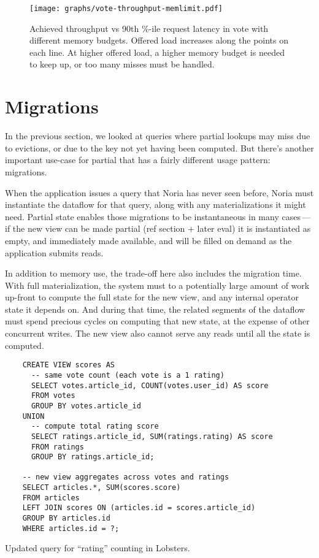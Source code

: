 \begin{figure}[ht]
  \centering
  \texttt{[image: graphs/vote-throughput-memlimit.pdf]}
  \caption{Achieved throughput vs 90th \%-ile request latency in vote with
  different memory budgets. Offered load increases along the points on each
  line. At higher offered load, a higher memory budget is needed to keep up, or
  too many misses must be handled.}
  \label{f:vote-throughput-memlimit}
\end{figure}

\section{Migrations}
\label{s:eval:cost:mig}

In the previous section, we looked at queries where partial lookups may miss due
to evictions, or due to the key not yet having been computed. But there's
another important use-case for partial that has a fairly different usage
pattern: migrations.

When the application issues a query that Noria has never seen before, Noria must
instantiate the dataflow for that query, along with any materializations it
might need. Partial state enables those migrations to be instantaneous in many
cases\,---\,if the new view can be made partial (ref section + later eval) it is
instantiated as empty, and immediately made available, and will be filled on
demand as the application submits reads.

In addition to memory use, the trade-off here also includes the migration time.
With full materialization, the system must to a potentially large amount of work
up-front to compute the full state for the new view, and any internal operator
state it depends on. And during that time, the related segments of the dataflow
must spend precious cycles on computing that new state, at the expense of other
concurrent writes. The new view also cannot serve any reads until all the state
is computed.

\begin{listing}[t]
  \begin{verbatim}
    CREATE VIEW scores AS
      -- same vote count (each vote is a 1 rating)
      SELECT votes.article_id, COUNT(votes.user_id) AS score
      FROM votes
      GROUP BY votes.article_id
    UNION
      -- compute total rating score
      SELECT ratings.article_id, SUM(ratings.rating) AS score
      FROM ratings
      GROUP BY ratings.article_id;

    -- new view aggregates across votes and ratings
    SELECT articles.*, SUM(scores.score)
    FROM articles
    LEFT JOIN scores ON (articles.id = scores.article_id)
    GROUP BY articles.id
    WHERE articles.id = ?;
  \end{verbatim}
  \caption{Updated query for ``rating'' counting in Lobsters.}
  \label{l:ratings}
\end{listing}

